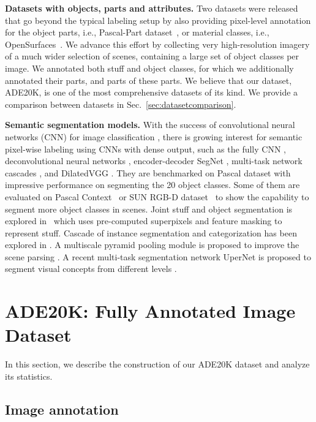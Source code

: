 {\bf Datasets with objects, parts and attributes.} Two datasets were released that go beyond the typical labeling setup by also providing pixel-level annotation for the object parts, i.e., Pascal-Part dataset~\citep{chen2014parts}, or material classes, i.e., OpenSurfaces~\citep{bell13opensurfaces,bell2015material}. We advance this effort by collecting very high-resolution imagery of a much wider selection of scenes, containing a large set of object classes per image. We annotated both stuff and object classes, for which we additionally annotated their parts, and parts of these parts. We believe that our dataset, ADE20K, is one of the most comprehensive datasets of its kind. We provide a comparison between datasets in Sec.~\ref{sec:datasetcomparison}.

{\bf Semantic segmentation models.} With the success of convolutional neural networks (CNN) for image classification \citep{krizhevsky2012imagenet}, there is growing interest for semantic pixel-wise labeling using CNNs with dense output, such as the fully CNN \citep{long2015fully}, deconvolutional neural networks \citep{noh2015learning}, encoder-decoder SegNet \citep{badrinarayanan2015segnet}, multi-task network cascades \citep{dai2015instance}, and DilatedVGG \citep{CP2016Deeplab, YuKoltun2016}. They are benchmarked on Pascal dataset with impressive performance on segmenting the 20 object classes. Some of them \citep{long2015fully,badrinarayanan2015segnet} are evaluated on Pascal Context~\citep{mottaghi2014role} or SUN RGB-D dataset~\citep{song2015sun} to show the capability to segment more object classes in scenes. Joint stuff and object segmentation is explored in~\citep{dai2015convolutional} which uses pre-computed superpixels and feature masking to represent stuff. Cascade of instance segmentation and categorization has been explored in \citep{dai2015instance}. A multiscale pyramid pooling module is proposed to improve the scene parsing \cite{zhao2017pyramid}. A recent multi-task segmentation network UperNet is proposed to segment visual concepts from different levels \cite{xiao2018unified}. 

\section{ADE20K: Fully Annotated Image Dataset}
\label{section:dataset_construction}
In this section, we describe the construction of our ADE20K dataset and analyze its statistics. 

\subsection{Image annotation}


